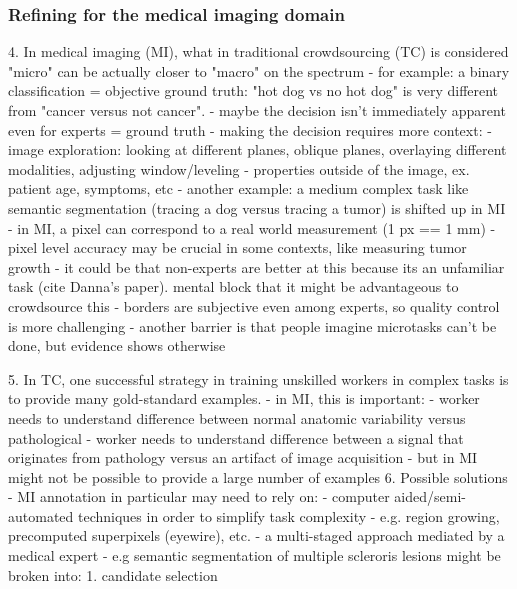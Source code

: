 \documentclass[10pt,twocolumn,letterpaper]{article}
\begin{document}
\subsubsection{Refining for the medical imaging domain}
4. In medical imaging (MI), what in traditional crowdsourcing (TC) is considered "micro" can be actually closer to "macro" on the spectrum
  - for example: a binary classification = objective ground truth: "hot dog vs no hot dog" is very different from "cancer versus not cancer". 
    - maybe the decision isn't immediately apparent even for experts = ground truth
    - making the decision requires more context:
      - image exploration: looking at different planes, oblique planes, overlaying different modalities, adjusting window/leveling 
      - properties outside of the image, ex. patient age, symptoms, etc
  - another example: a medium complex task like semantic segmentation (tracing a dog versus tracing a tumor) is shifted up in MI
    - in MI, a pixel can correspond to a real world measurement (1 px == 1 mm) 
      - pixel level accuracy may be crucial in some contexts, like measuring tumor growth
      - it could be that non-experts are better at this because its an unfamiliar task (cite Danna's paper). mental block that it might be advantageous to crowdsource this
    - borders are subjective even among experts, so quality control is more challenging
  - another barrier is that people imagine microtasks can't be done, but evidence shows otherwise

5. In TC, one successful strategy in training unskilled workers in complex tasks is to provide many gold-standard examples.  %
  - in MI, this is important:
    - worker needs to understand difference between normal anatomic variability versus pathological
    - worker needs to understand difference between a signal that originates from pathology versus an artifact of image acquisition
  - but in MI might not be possible to provide a large number of examples
6. Possible solutions - MI annotation in particular may need to rely on: 
  - computer aided/semi-automated techniques in order to simplify task complexity
    - e.g. region growing, precomputed superpixels (eyewire), etc. 
  - a multi-staged approach mediated by a medical expert
    - e.g semantic segmentation of multiple scleroris lesions might be broken into:
      1. candidate selection
\end{document}
